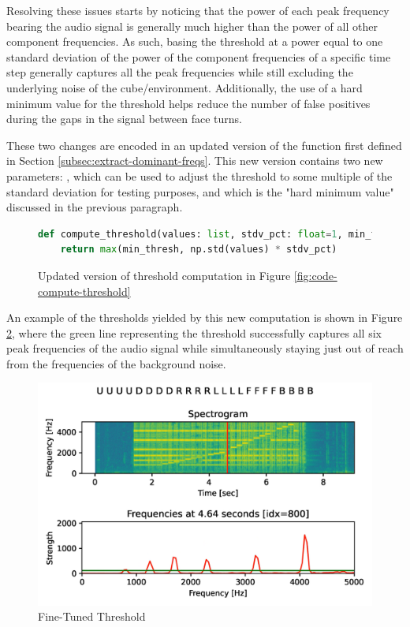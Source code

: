 \newpage

Resolving these issues starts by noticing that the power of each peak
frequency bearing the audio signal is generally much higher than the
power of all other component frequencies. As such, basing the threshold
at a power equal to one standard deviation of the power of the
component frequencies of a specific time step generally captures all
the peak frequencies while still excluding the underlying noise of the
cube/environment. Additionally, the use of a hard minimum value for the
threshold helps reduce the number of false positives during the gaps in
the signal between face turns.

These two changes are encoded in an updated version of the
 function first defined in Section
\ref{subsec:extract-dominant-freqs}. This new version contains two new
parameters: , which can be used to adjust the threshold
to some multiple of the standard deviation for testing purposes, and
 which is the "hard minimum value" discussed in the
previous paragraph.

\begin{figure}[h]
\caption{Updated version of threshold computation in Figure \ref{fig:code-compute-threshold}}
\label{fig:code-compute-threshold-v2}
\begin{lstlisting}[language=Python]
def compute_threshold(values: list, stdv_pct: float=1, min_thresh: int=50):
    return max(min_thresh, np.std(values) * stdv_pct)
\end{lstlisting}
\end{figure}

An example of the thresholds yielded by this new computation is shown
in Figure \ref{fig:threshold-refined}, where the green line
representing the threshold successfully captures all six peak
frequencies of the audio signal while simultaneously staying just out
of reach from the frequencies of the background noise.

\begin{figure}[h]
    \centering
    \caption{Fine-Tuned Threshold}
    \label{fig:threshold-refined}
    \includegraphics[width=0.8\linewidth]{Figures/5 Algorithm Design/threshold-refined.png}
\end{figure}

